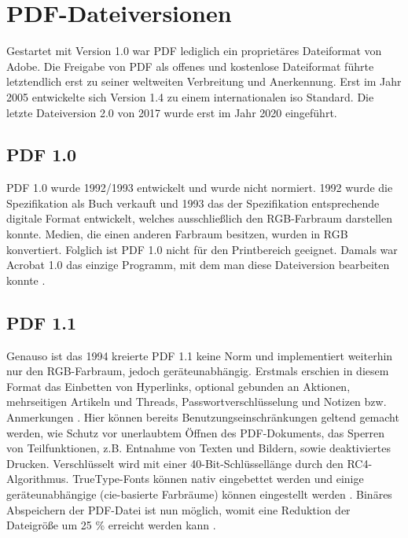 \section{PDF-Dateiversionen}
Gestartet mit Version 1.0 war PDF lediglich ein proprietäres Dateiformat von Adobe. Die Freigabe von PDF als offenes und kostenlose Dateiformat führte letztendlich erst zu seiner weltweiten Verbreitung und Anerkennung. Erst im Jahr 2005 entwickelte sich Version 1.4 zu einem internationalen \gls{iso} Standard. Die letzte Dateiversion 2.0 von 2017 wurde erst im Jahr 2020 eingeführt.

\subsection{PDF 1.0}
PDF 1.0 wurde 1992/1993 entwickelt und wurde nicht normiert. 1992 wurde die Spezifikation als Buch verkauft und 1993 das der Spezifikation entsprechende digitale Format entwickelt, welches ausschließlich den RGB-Farbraum darstellen konnte. Medien, die einen anderen Farbraum besitzen, wurden in RGB konvertiert. Folglich ist PDF 1.0 nicht für den Printbereich geeignet. Damals war Acrobat 1.0 das einzige Programm, mit dem man diese Dateiversion bearbeiten konnte \cite{proj-consult}. 

\subsection{PDF 1.1}
Genauso ist das 1994 kreierte PDF 1.1 keine Norm und implementiert weiterhin nur den RGB-Farbraum, jedoch geräteunabhängig. Erstmals erschien in diesem Format das Einbetten von Hyperlinks, optional gebunden an Aktionen, mehrseitigen Artikeln und Threads, Passwortverschlüsselung und Notizen bzw. Anmerkungen \cite{proj-consult}. Hier können bereits Benutzungseinschränkungen geltend gemacht werden, wie Schutz vor unerlaubtem Öffnen des PDF-Dokuments, das Sperren von Teilfunktionen, z.B. Entnahme von Texten und Bildern, sowie deaktiviertes Drucken. Verschlüsselt wird mit einer 40-Bit-Schlüssellänge durch den RC4-Algorithmus. TrueType-Fonts können nativ eingebettet werden und einige geräteunabhängige (\gls{cie}-basierte Farbräume) können eingestellt werden \cite{schneeberger}. Binäres Abspeichern der PDF-Datei ist nun möglich, womit eine Reduktion der Dateigröße um 25 \% erreicht werden kann \cite{schneeberger}.

